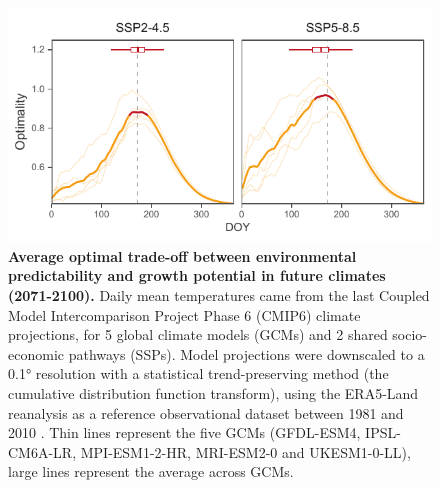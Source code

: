 \documentclass[11pt,letter]{article}
\begin{document}
\vspace*{-0.7cm}
\begin{figure}[h]
\centering
\includegraphics{optimality_future.pdf}
\vspace*{-0.5cm}
\caption{\textbf{Average optimal trade-off between environmental predictability and growth potential in future climates (2071-2100).} Daily mean temperatures came from the last Coupled Model Intercomparison Project Phase 6 (CMIP6) climate  projections, for 5 global climate models (GCMs) and 2 shared socio-economic pathways (SSPs). Model projections were downscaled to a 0.1° resolution with a statistical trend-preserving method (the cumulative distribution function transform), using the ERA5-Land reanalysis as a reference observational dataset between 1981 and 2010 \citep{Noel2022}. Thin lines represent the five GCMs (GFDL-ESM4, IPSL-CM6A-LR, MPI-ESM1-2-HR, MRI-ESM2-0 and UKESM1-0-LL), large lines represent the average across GCMs.}
\label{fig:future}

\end{figure}
\end{document}
